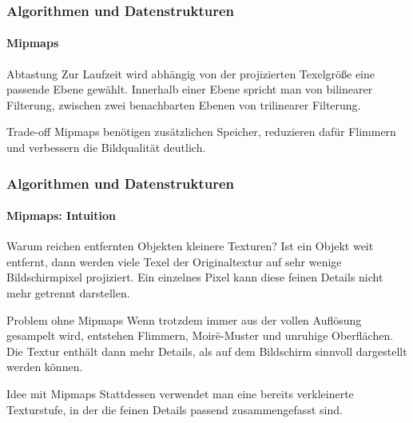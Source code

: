 \documentclass{beamer}
\begin{document}
\begin{frame}
    \frametitle{Algorithmen und Datenstrukturen}
    \framesubtitle{Mipmaps}
    \small
    \begin{block}{Abtastung}
    Zur Laufzeit wird abh\"angig von der projizierten Texelgr\"o{\ss}e eine
    passende Ebene gew\"ahlt. Innerhalb einer Ebene spricht man von bilinearer
    Filterung, zwischen zwei benachbarten Ebenen von trilinearer Filterung.
    \end{block}

    \begin{block}{Trade-off}
    Mipmaps ben\"otigen zus\"atzlichen Speicher, reduzieren daf\"ur Flimmern
    und verbessern die Bildqualit\"at deutlich.
    \end{block}
\end{frame}


\begin{frame}
    \frametitle{Algorithmen und Datenstrukturen}
    \framesubtitle{Mipmaps: Intuition}
    \small
    \begin{block}{Warum reichen entfernten Objekten kleinere Texturen?}
    Ist ein Objekt weit entfernt, dann werden viele Texel der Originaltextur
    auf sehr wenige Bildschirmpixel projiziert. Ein einzelnes Pixel kann diese
    feinen Details nicht mehr getrennt darstellen.
    \end{block}

    \begin{block}{Problem ohne Mipmaps}
    Wenn trotzdem immer aus der vollen Aufl\"osung gesampelt wird, entstehen
    Flimmern, Moir\"e-Muster und unruhige Oberfl\"achen. Die Textur enth\"alt
    dann mehr Details, als auf dem Bildschirm sinnvoll dargestellt werden
    k\"onnen.
    \end{block}

    \begin{block}{Idee mit Mipmaps}
    Stattdessen verwendet man eine bereits verkleinerte Texturstufe, in der
    die feinen Details passend zusammengefasst sind.
    \end{block}
\end{frame}
\end{document}
